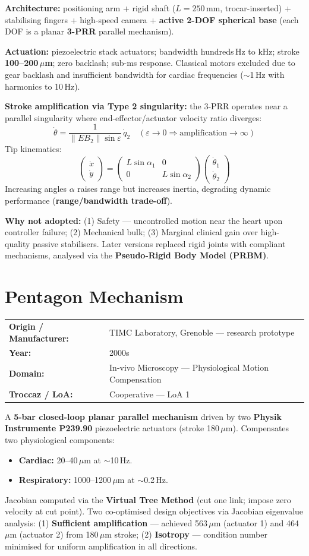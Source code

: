 \documentclass[11pt,a4paper,twoside]{report}
\makeatletter
\newcommand{\robotmeta}[4]{%
  \noindent\begin{tabular}{@{}ll@{}}
    \textbf{Origin / Manufacturer:} & #1 \\
    \textbf{Year:}                  & #2 \\
    \textbf{Domain:}                & #3 \\
    \textbf{Troccaz / LoA:}         & #4 \\
  \end{tabular}\par\smallskip\noindent}
\makeatother
\begin{document}
\textbf{Architecture:} positioning arm + rigid shaft ($L = 250$\,mm, trocar-inserted) + stabilising fingers + high-speed camera + \textbf{active 2-DOF spherical base} (each DOF is a planar \textbf{3-PRR} parallel mechanism).

\textbf{Actuation:} piezoelectric stack actuators; bandwidth hundreds\,Hz to kHz; stroke \textbf{100--200\,$\mu$m}; zero backlash; sub-ms response. Classical motors excluded due to gear backlash and insufficient bandwidth for cardiac frequencies ($\sim$1\,Hz with harmonics to 10\,Hz).

\textbf{Stroke amplification via Type 2 singularity:} the 3-PRR operates near a parallel singularity where end-effector/actuator velocity ratio diverges:
\[ \dot{\theta} = \frac{1}{\|EB_2\|\sin\varepsilon}\,\dot{q}_2 \quad (\varepsilon \to 0 \Rightarrow \text{amplification} \to \infty) \]
Tip kinematics:
\[ \begin{pmatrix}\dot{x}\\\dot{y}\end{pmatrix} = \begin{pmatrix}L\sin\alpha_1 & 0\\ 0 & L\sin\alpha_2\end{pmatrix}\begin{pmatrix}\dot{\theta}_1\\\dot{\theta}_2\end{pmatrix} \]
Increasing angles $\alpha$ raises range but increases inertia, degrading dynamic performance (\textbf{range/bandwidth trade-off}).

\textbf{Why not adopted:} (1) Safety — uncontrolled motion near the heart upon controller failure; (2) Mechanical bulk; (3) Marginal clinical gain over high-quality passive stabilisers. Later versions replaced rigid joints with compliant mechanisms, analysed via the \textbf{Pseudo-Rigid Body Model (PRBM)}.

\section{Pentagon Mechanism}
\robotmeta{TIMC Laboratory, Grenoble — research prototype}{2000s}{In-vivo Microscopy — Physiological Motion Compensation}{Cooperative — LoA 1}
A \textbf{5-bar closed-loop planar parallel mechanism} driven by two \textbf{Physik Instrumente P239.90} piezoelectric actuators (stroke 180\,$\mu$m). Compensates two physiological components:
\begin{itemize}
  \item \textbf{Cardiac:} 20--40\,$\mu$m at $\sim$10\,Hz.
  \item \textbf{Respiratory:} 1000--1200\,$\mu$m at $\sim$0.2\,Hz.
\end{itemize}
Jacobian computed via the \textbf{Virtual Tree Method} (cut one link; impose zero velocity at cut point). Two co-optimised design objectives via Jacobian eigenvalue analysis: (1) \textbf{Sufficient amplification} — achieved 563\,$\mu$m (actuator 1) and 464\,$\mu$m (actuator 2) from 180\,$\mu$m stroke; (2) \textbf{Isotropy} — condition number minimised for uniform amplification in all directions.
\end{document}
